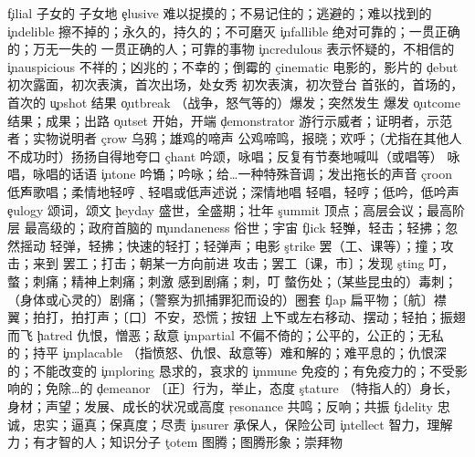 \begin{multicols}{2}
\c{filial}  \a 子女的 \ad 子女地
\c{elusive}  \a 难以捉摸的；不易记住的；逃避的；难以找到的
\c{indelible}  \a 擦不掉的；永久的，持久的；不可磨灭
\c{infallible}  \a 绝对可靠的；一贯正确的；万无一失的 \n 一贯正确的人；可靠的事物
\c{incredulous}  \a 表示怀疑的，不相信的
\c{inauspicious}  \a 不祥的；凶兆的；不幸的；倒霉的
\c{cinematic}  \a 电影的，影片的
\c{debut}  \n 初次露面，初次表演，首次出场，处女秀 \v 初次表演，初次登台 \a 首张的，首场的，首次的
\c{upshot}  \n 结果
\c{outbreak}  \n （战争，怒气等的）爆发；突然发生 \vi 爆发
\c{outcome}  \n 结果；成果；出路
\c{outset}  \n 开始，开端
\c{demonstrator}  \n 游行示威者；证明者，示范者；实物说明者
\c{crow}  \n 乌鸦；雄鸡的啼声 \vi 公鸡啼鸣，报晓；欢呼；（尤指在其他人不成功时）扬扬自得地夸口
\c{chant}  \vt 吟颂，咏唱；反复有节奏地喊叫（或唱等） \n 咏唱，咏唱的话语
\c{intone}  \v 吟诵；吟咏；给…一种特殊音调；发出拖长的声音
\c{croon}  \v 低声歌唱；柔情地轻哼﹑轻唱或低声述说；深情地唱 \n 轻唱，轻哼；低吟，低吟声
\c{eulogy}  \n 颂词，颂文
\c{heyday}  \n 盛世，全盛期；壮年
\c{summit}  \n 顶点；高层会议；最高阶层 \a 最高级的；政府首脑的
\c{mundaneness}  \n 俗世；宇宙
\c{flick}  \v 轻弹，轻击；轻拂；忽然摇动 \n 轻弹，轻拂；快速的轻打；轻弹声；电影
\c{strike}  \vt 罢（工、课等）；撞；攻击；来到 \vi 罢工；打击；朝某一方向前进 \n 攻击；罢工〔课，市〕；发现
\c{sting}  \vt 叮，螫；刺痛；精神上刺痛；刺激 \vi 感到剧痛；刺，叮 \n 螫伤处；（某些昆虫的）毒刺；（身体或心灵的）剧痛；（警察为抓捕罪犯而设的）圈套
\c{flap}  \n 扁平物；〔航〕襟翼；拍打，拍打声；〔口〕不安，恐慌；按钮 \v 上下或左右移动、摆动；轻拍；振翅而飞
\c{hatred}  \n 仇恨，憎恶；敌意
\c{impartial}  \a 不偏不倚的；公平的，公正的；无私的；持平
\c{implacable}  \a （指愤怒、仇恨、敌意等）难和解的；难平息的；仇恨深的；不能改变的
\c{imploring}  \a 恳求的，哀求的
\c{immune}  \a 免疫的；有免疫力的；不受影响的；免除…的
\c{demeanor}  \n 〔正〕行为，举止，态度
\c{stature}  \n （特指人的）身长，身材；声望；发展、成长的状况或高度
\c{resonance}  \n 共鸣；反响；共振
\c{fidelity}  \n 忠诚，忠实；逼真；保真度；尽责
\c{insurer}  \n 承保人，保险公司
\c{intellect}  \n 智力，理解力；有才智的人；知识分子
\c{totem}  \n 图腾；图腾形象；崇拜物

\end{multicols}
